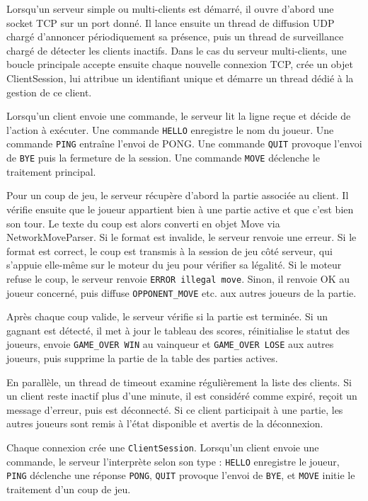 \documentclass[a4paper]{article}
\begin{document}
Lorsqu’un serveur simple ou multi-clients est démarré, il ouvre d’abord une socket TCP sur un port donné. Il lance ensuite un thread de diffusion UDP chargé d’annoncer périodiquement sa présence, puis un thread de surveillance chargé de détecter les clients inactifs. Dans le cas du serveur multi-clients, une boucle principale accepte ensuite chaque nouvelle connexion TCP, crée un objet ClientSession, lui attribue un identifiant unique et démarre un thread dédié à la gestion de ce client.

Lorsqu’un client envoie une commande, le serveur lit la ligne reçue et décide de l’action à exécuter. Une commande \texttt{HELLO} enregistre le nom du joueur. Une commande \texttt{PING} entraîne l’envoi de PONG. Une commande \texttt{QUIT} provoque l’envoi de \texttt{BYE} puis la fermeture de la session. Une commande \texttt{MOVE} déclenche le traitement principal.

Pour un coup de jeu, le serveur récupère d’abord la partie associée au client. Il vérifie ensuite que le joueur appartient bien à une partie active et que c’est bien son tour. Le texte du coup est alors converti en objet Move via NetworkMoveParser. Si le format est invalide, le serveur renvoie une erreur. Si le format est correct, le coup est transmis à la session de jeu côté serveur, qui s’appuie elle-même sur le moteur du jeu pour vérifier sa légalité. Si le moteur refuse le coup, le serveur renvoie \texttt{ERROR illegal move}. Sinon, il renvoie OK au joueur concerné, puis diffuse \texttt{OPPONENT\_MOVE} etc. aux autres joueurs de la partie.

Après chaque coup valide, le serveur vérifie si la partie est terminée. Si un gagnant est détecté, il met à jour le tableau des scores, réinitialise le statut des joueurs, envoie \texttt{GAME\_OVER WIN} au vainqueur et \texttt{GAME\_OVER LOSE} aux autres joueurs, puis supprime la partie de la table des parties actives.

En parallèle, un thread de timeout examine régulièrement la liste des clients. Si un client reste inactif plus d’une minute, il est considéré comme expiré, reçoit un message d’erreur, puis est déconnecté. Si ce client participait à une partie, les autres joueurs sont remis à l’état disponible et avertis de la déconnexion.



Chaque connexion crée une \texttt{ClientSession}. Lorsqu’un client envoie une commande, le serveur l'interprète selon son type : \texttt{HELLO} enregistre le joueur, \texttt{PING} déclenche une réponse \texttt{PONG}, \texttt{QUIT} provoque l'envoi de \texttt{BYE}, et \texttt{MOVE} initie le traitement d'un coup de jeu.
\end{document}
